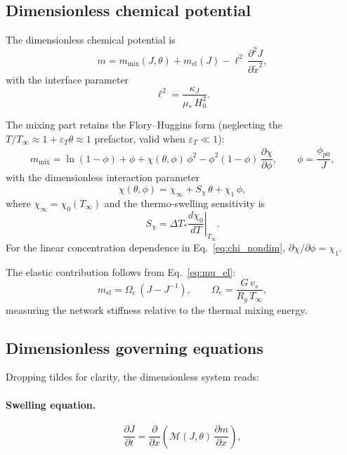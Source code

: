 \documentclass[11pt]{article}
\newcommand{\Ms}{\mathcal{M}}
\newcommand{\pp}{\phi_{p0}}
\begin{document}
\subsection{Dimensionless chemical potential}

The dimensionless chemical potential is
\begin{equation}
  m = m_\mathrm{mix}(J,\theta) + m_\mathrm{el}(J) - \ell^2\,\frac{\partial^2 J}{\partial \tilde{x}^2},
  \label{eq:m_nondim}
\end{equation}
with the interface parameter
\begin{equation}
  \ell^2 = \frac{\kappa_J}{\mu_*\,H_0^2}.
\end{equation}

The mixing part retains the Flory--Huggins form (neglecting the
$T/T_\infty\approx 1+\varepsilon_T\theta\approx 1$ prefactor, valid
when $\varepsilon_T\ll 1$):
\begin{equation}
  m_\mathrm{mix} = \ln(1-\phi) + \phi + \chi(\theta,\phi)\,\phi^2
  -\phi^2(1-\phi)\,\frac{\partial\chi}{\partial\phi},
  \qquad \phi = \frac{\pp}{J},
  \label{eq:m_mix}
\end{equation}
with the dimensionless interaction parameter
\begin{equation}
  \chi(\theta,\phi) = \chi_\infty + S_\chi\,\theta + \chi_1\,\phi,
  \label{eq:chi_nondim}
\end{equation}
where $\chi_\infty = \chi_0(T_\infty)$ and the thermo-swelling sensitivity is
\begin{equation}
  S_\chi = \Delta T_*\left.\frac{d\chi_0}{dT}\right|_{T_\infty}.
  \label{eq:Schi}
\end{equation}
For the linear concentration dependence in Eq.~\eqref{eq:chi_nondim},
$\partial\chi/\partial\phi=\chi_1$.

The elastic contribution follows from Eq.~\eqref{eq:mu_el}:
\begin{equation}
  m_\mathrm{el} = \Omega_e\,(J - J^{-1}),
  \qquad
  \Omega_e = \frac{G\,v_s}{R_g\,T_\infty},
\end{equation}
measuring the network stiffness relative to the thermal mixing energy.

\subsection{Dimensionless governing equations}

Dropping tildes for clarity, the dimensionless system reads:

\paragraph{Swelling equation.}
\begin{equation}
  \frac{\partial J}{\partial t}
  = \frac{\partial}{\partial x}\!\left(\Ms(J,\theta)\,\frac{\partial m}{\partial x}\right),
  \label{eq:J_nondim}
\end{equation}
\end{document}

